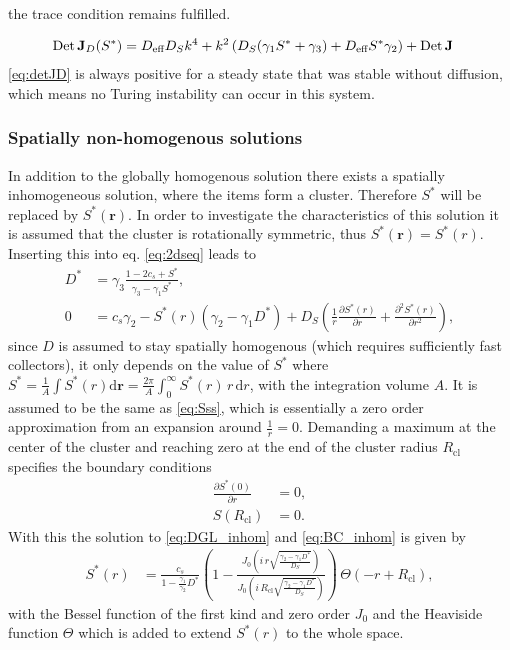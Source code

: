 the trace condition remains fulfilled. 

\begin{align}
 \label{eq:detJD}\operatorname{Det} \mathbf{J}_D(S^*) &= D_{\text{eff}}D_S k^4+k^2\left(D_S(\gamma_1 S^*+\gamma_3)+D_{\text{eff}}S^*\gamma_2\right)+\operatorname{Det} \mathbf{J}
\end{align}
%
\eqref{eq:detJD} is always positive for a steady state that was stable without diffusion, which means no Turing instability can occur in this system.

\subsubsection{Spatially non-homogenous solutions}

In addition to the globally homogenous solution there exists a spatially inhomogeneous solution, where the items form a cluster. 
Therefore $S^*$ will be replaced by $S^*(\mathbf r)$. In order to investigate the characteristics of this solution it is assumed that the cluster is rotationally
 symmetric, thus $S^*(\mathbf r)=S^*(r)$. Inserting this into eq. \eqref{eq:2dseq} leads to
%
\begin{align}
 \nonumber D^* &= \gamma_3\frac{1-2c_s+S^*}{\gamma_3-\gamma_1 S^*},\\
 0 &= c_s\gamma_2-S^*(r)\left(\gamma_2-\gamma_1 D^*\right)+D_S\left(\frac{1}{r}\frac{\partial S^*(r)}{\partial r}+\frac{\partial^2 S^*(r)}{\partial r^2}\right),
 \label{eq:DGL_inhom}
\end{align}
since $D$ is assumed to stay spatially homogenous (which requires sufficiently fast collectors), it only depends on the value of $S^*$ where $S^*=\frac{1}{A}\int S^*(r) \mathrm d\mathbf r=\frac{2\pi}{A}\int_0^\infty S^*(r)\,r\,\mathrm dr$, with the integration volume $A$.
It is assumed to be the same as \eqref{eq:Sss}, which is essentially a zero order approximation from an expansion around $\frac{1}{r}=0$.
Demanding a maximum at the center of the cluster and reaching zero at the end of the cluster radius $R_\text{cl}$ specifies the boundary conditions 
%
\begin{align}
 \nonumber \frac{\partial S^*(0)}{\partial r} &= 0, \\
 S(R_\text{cl}) &= 0.
\label{eq:BC_inhom}
\end{align}
%
With this the solution to \eqref{eq:DGL_inhom} and \eqref{eq:BC_inhom} is given by
%
\begin{align}
 S^*(r) &= \frac{c_s}{1-\frac{\gamma_1}{\gamma_2}D^*}\left(1-\frac{J_0\left(i\,r\sqrt{\frac{\gamma_2-\gamma_1D^*}{D_S}}\right)}{J_0\left(i\,R_\text{cl}\sqrt{\frac{\gamma_2-\gamma_1D^*}{D_S}}\right)}\right)\,\Theta(-r+R_\text{cl}),
\end{align}
%
with the Bessel function of the first kind and zero order $J_0$ and the Heaviside function $\Theta$ which is added to extend $S^*(r)$ to the whole space.

